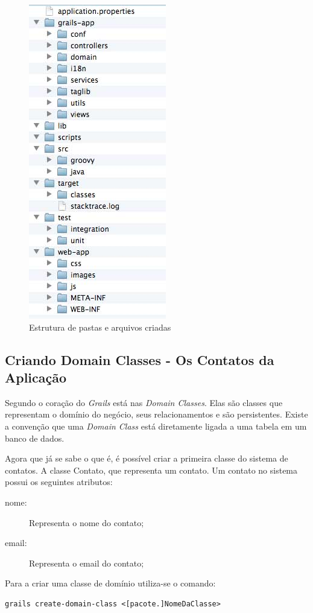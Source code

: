 \documentclass[12pt]{article}
\begin{document}
    \begin{figure}[h!]
    \centering
    \includegraphics[width=.25\textwidth]{images/appStructure.jpg}
    \caption{Estrutura de pastas e arquivos criadas}
    \label{fig:appStructure}
    \end{figure}

\subsection{Criando Domain Classes - Os Contatos da Aplicação}

    Segundo \cite{pragmaticGrails:2009} o coração do \emph{Grails} está nas \emph{Domain Classes}.
    Elas são classes que representam o domínio do negócio, seus relacionamentos e
    são persistentes. Existe a convenção que uma \emph{Domain Class} está diretamente 
    ligada a uma tabela em um banco de dados.
    
    Agora que já se sabe o que é, é possível criar a primeira classe do sistema 
    de contatos. A classe Contato, que representa um contato. Um contato no sistema
    possui os seguintes atributos:
    
    \begin{description}
        \item[nome:] Representa o nome do contato;
        \item[email:] Representa o email do contato;
    \end{description}
    
    Para a criar uma classe de domínio utiliza-se o comando: 

    \begin{lstlisting}[basicstyle={\small \ttfamily}]
       grails create-domain-class <[pacote.]NomeDaClasse>
    \end{lstlisting}
    
\end{document}
